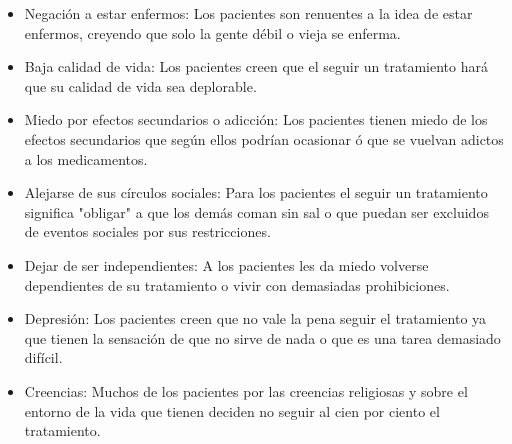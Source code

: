 \begin{itemize}
	\item Negación a estar enfermos: Los pacientes son renuentes a la idea de estar enfermos, creyendo que solo la gente débil o vieja se enferma.
	\item Baja calidad de vida: Los pacientes creen que el seguir un tratamiento hará que su calidad de vida sea deplorable.
	\item Miedo por efectos secundarios o adicción: Los pacientes tienen miedo de los efectos secundarios que según ellos podrían ocasionar ó que se vuelvan adictos a los medicamentos.
	\item Alejarse de sus círculos sociales: Para los pacientes el seguir un tratamiento significa "obligar" a que los demás coman sin sal o que puedan ser excluidos de eventos sociales por sus restricciones.
	\item Dejar de ser independientes: A los pacientes les da miedo volverse dependientes de su tratamiento o vivir con demasiadas prohibiciones.
	\item Depresión: Los pacientes creen que no vale la pena seguir el tratamiento ya que tienen la sensación de que no sirve de nada o que es una tarea demasiado difícil.
	\item Creencias: Muchos de los pacientes por las creencias religiosas y sobre el entorno de la vida que tienen deciden no seguir al cien por ciento el tratamiento.
\end{itemize}


